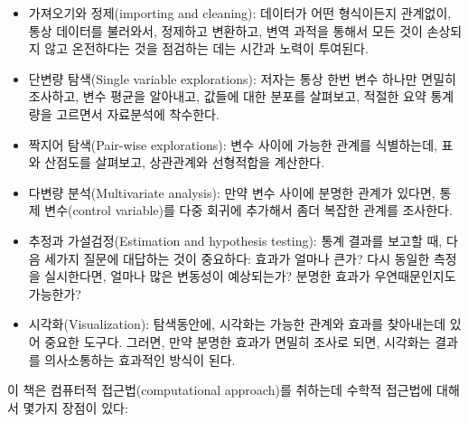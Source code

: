 \begin{itemize}

\item 
가져오기와 정제(importing and cleaning): 데이터가 어떤 형식이든지 관계없이, 통상 데이터를 불러와서, 정제하고 변환하고, 변역 과적을 통해서 모든 것이 손상되지 않고 온전하다는 것을 점검하는 데는 시간과 노력이 투여된다.

\item 단변량 탐색(Single variable explorations): 
저자는 통상 한번 변수 하나만 면밀히 조사하고, 변수 평균을 알아내고, 값들에 대한 분포를 살펴보고, 적절한 요약 통계량을 고르면서 자료분석에 착수한다.

\item 짝지어 탐색(Pair-wise explorations): 
변수 사이에 가능한 관계를 식별하는데, 표와 산점도를 살펴보고, 상관관계와 선형적합을 계산한다.

\item 다변량 분석(Multivariate analysis): 
만약 변수 사이에 분명한 관계가 있다면, 통제 변수(control variable)를 다중 회귀에 추가해서 좀더 복잡한 관계를 조사한다.

\item 
추정과 가설검정(Estimation and hypothesis testing): 
통계 결과를 보고할 때, 다음 세가지 질문에 대답하는 것이 중요하다: 효과가 얼마나 큰가?
다시 동일한 측정을 실시한다면, 얼마나 많은 변동성이 예상되는가? 분명한 효과가 우연때문인지도 가능한가?

\item 시각화(Visualization): 
탐색동안에, 시각화는 가능한 관계와 효과를 찾아내는데 있어 중요한 도구다. 
그러면, 만약 분명한 효과가 면밀히 조사로 되면, 시각화는 결과를 의사소통하는 효과적인 방식이 된다.

\end{itemize}

이 책은 컴퓨터적 접근법(computational approach)를 취하는데 수학적 접근법에 대해서 몇가지 장점이 있다:

